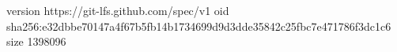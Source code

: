 version https://git-lfs.github.com/spec/v1
oid sha256:e32dbbe70147a4f67b5fb14b1734699d9d3dde35842c25fbc7e471786f3dc1c6
size 1398096
